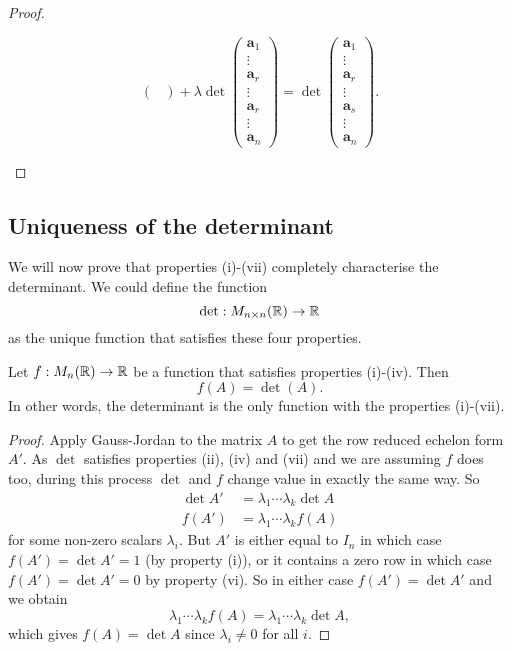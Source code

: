 \documentclass[10pt, a4paper]{article}
\newcommand{\mbf}[1]{\mathbf{#1}}
\begin{document}
\begin{enumerate}[label = (\roman*)]
\begin{proof}
\begin{enumerate}[label = (\roman*)]
\[\begin{pmatrix}
            \end{pmatrix}
            +
            \lambda
            \det\begin{pmatrix}
                \mbf{a}_1 \\ \vdots \\ \mbf{a}_r \\ \vdots \\ \mbf{a}_r \\ \vdots \\ \mbf{a}_n
            \end{pmatrix}
            =
            \det\begin{pmatrix}
                \mbf{a}_1 \\ \vdots \\ \mbf{a}_r \\ \vdots \\ \mbf{a}_s \\ \vdots \\ \mbf{a}_n
            \end{pmatrix}.
            \]
        \end{enumerate}
    \end{proof}
\end{enumerate}

\subsection{Uniqueness of the determinant}
We will now prove that properties (i)-(vii) completely characterise the determinant.
We could define the function
\[
\det : M_{n \times n}(\mathbb{R}) \rightarrow \mathbb{R}
\]
as the unique function that satisfies these four properties.
\begin{theorem}
    Let $f: M_n(\mathbb{R}) \rightarrow \mathbb{R}$ be a function that satisfies properties (i)-(iv).
    Then
    \[
    f(A) = \det(A).
    \]
    In other words,
    the determinant is the only function with the properties (i)-(vii).
    \begin{proof}
        Apply Gauss-Jordan to the matrix $A$ to get the row reduced echelon form $A'$.
        As $\det$ satisfies properties (ii), (iv) and (vii) and we are assuming $f$ does too,
        during this process $\det$ and $f$ change value in exactly the same way.
        So
        \begin{align*}
            \det A' &= \lambda_1\dotsi\lambda_k\det A \\
            f(A') &= \lambda_1\dotsi\lambda_kf(A)
        \end{align*}
        for some non-zero scalars $\lambda_i$.
        But $A'$ is either equal to $I_n$ in which case $f(A') = \det A' = 1$ (by property (i)),
        or it contains a zero row in which case $f(A') = \det A' = 0$ by property (vi).
        So in either case $f(A') = \det A'$ and we obtain
        \[
        \lambda_1\dotsi\lambda_kf(A) = \lambda_1\dotsi\lambda_k\det A,
        \]
        which gives $f(A) = \det A$ since $\lambda_i \neq 0$ for all $i$.
    \end{proof}
\end{theorem}
\end{document}
